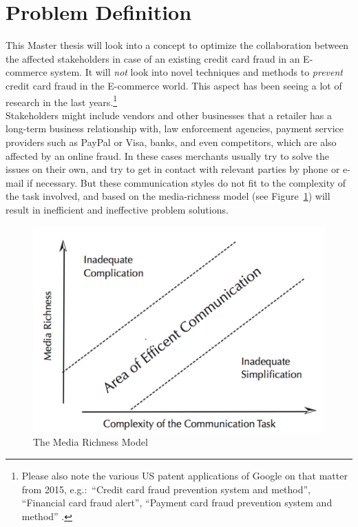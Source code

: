 
\section{Problem Definition}
\label{sec:problem_definition}

This Master thesis will look into a concept to optimize the collaboration between the affected stakeholders in case of an existing credit card fraud in an \gls{E-commerce} system. It will \emph{not} look into novel techniques and methods to \emph{prevent} credit card fraud in the \gls{E-commerce} world. This aspect has been seeing a lot of research in the last years.\footnote{Please also note the various US patent applications of Google on that matter from 2015, e.g.:\ “Credit card fraud prevention system and method”, “Financial card fraud alert”, “Payment card fraud prevention system and method” \citep{GooglePatents2015}.} \\

Stakeholders might include vendors and other businesses that a retailer has a long-term business relationship with, law enforcement agencies, payment service providers such as PayPal or Visa, banks, and even competitors, which are also affected by an online fraud. In these cases merchants usually try to solve the issues on their own, and try to get in contact with relevant parties by phone or e-mail if necessary. But these communication styles do not fit to the complexity of the task involved, and based on the media-richness model (see Figure~\ref{fig:images_media_richness_model}) will result in inefficient and ineffective problem solutions. \\

\begin{figure}[!ht]
	\centering
		\includegraphics[width=0.9\columnwidth]{images/media-richness-model.png}
	\caption[The Media Richness Model]{The Media Richness Model \citep{Rice1992}}
\label{fig:images_media_richness_model}
\end{figure}

